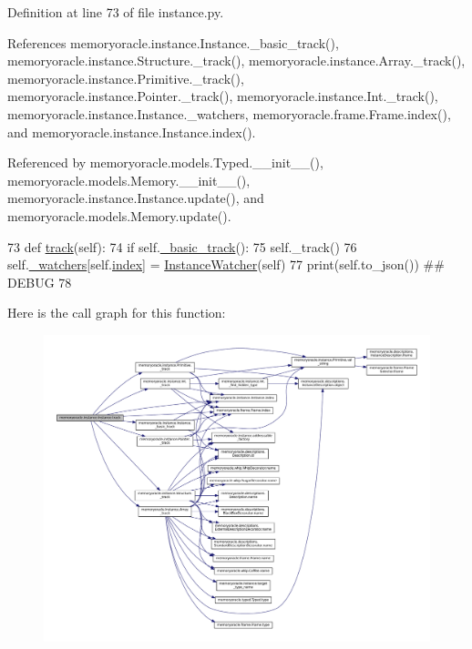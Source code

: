 Definition at line 73 of file instance.\+py.



References memoryoracle.\+instance.\+Instance.\+\_\+basic\+\_\+track(), memoryoracle.\+instance.\+Structure.\+\_\+track(), memoryoracle.\+instance.\+Array.\+\_\+track(), memoryoracle.\+instance.\+Primitive.\+\_\+track(), memoryoracle.\+instance.\+Pointer.\+\_\+track(), memoryoracle.\+instance.\+Int.\+\_\+track(), memoryoracle.\+instance.\+Instance.\+\_\+watchers, memoryoracle.\+frame.\+Frame.\+index(), and memoryoracle.\+instance.\+Instance.\+index().



Referenced by memoryoracle.\+models.\+Typed.\+\_\+\+\_\+init\+\_\+\+\_\+(), memoryoracle.\+models.\+Memory.\+\_\+\+\_\+init\+\_\+\+\_\+(), memoryoracle.\+instance.\+Instance.\+update(), and memoryoracle.\+models.\+Memory.\+update().


\begin{DoxyCode}
73     \textcolor{keyword}{def }\hyperlink{classmemoryoracle_1_1instance_1_1Instance_a86649e01ee4f562debdba5421a334f78}{track}(self):
74         \textcolor{keywordflow}{if} self.\hyperlink{classmemoryoracle_1_1instance_1_1Instance_a254a208a64e4c7f32c514e2fb64edbbe}{\_basic\_track}():
75             self.\_track()
76             self.\hyperlink{classmemoryoracle_1_1instance_1_1Instance_a8a701dbed8c8c14d7e59e94d78a559c0}{\_watchers}[self.\hyperlink{classmemoryoracle_1_1instance_1_1Instance_a67d649391bded2256ff9a72e2a61143f}{index}] = \hyperlink{classmemoryoracle_1_1instance_1_1InstanceWatcher}{InstanceWatcher}(self)
77             print(self.to\_json()) \textcolor{comment}{## DEBUG}
78 
\end{DoxyCode}


Here is the call graph for this function\+:
\nopagebreak
\begin{figure}[H]
\begin{center}
\leavevmode
\includegraphics[width=350pt]{classmemoryoracle_1_1instance_1_1Instance_a86649e01ee4f562debdba5421a334f78_cgraph}
\end{center}
\end{figure}




